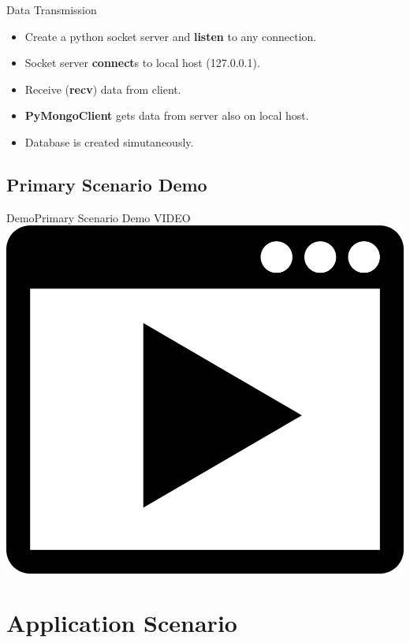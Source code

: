 \documentclass[11pt]{beamer}
\begin{document}
\begin{frame}{Data Transmission}
  \begin{itemize}
    \item Create a python socket server and \textbf{listen} to any connection.
    \item Socket server \textbf{connect}s to local host (127.0.0.1).
    \item Receive (\textbf{recv}) data from client.
    \item \textbf{PyMongoClient} gets data from server also on local host.
    \item Database is created simutaneously.
  \end{itemize}
\end{frame}


\subsection{Primary Scenario Demo}
\begin{frame}{Demo}{Primary Scenario Demo}
  \centering
  \Huge{VIDEO}\includegraphics[scale=0.025]{228-2283562_png-file-video-icon-vector-png.png}
\end{frame}

\section{Application Scenario}
\end{document}

